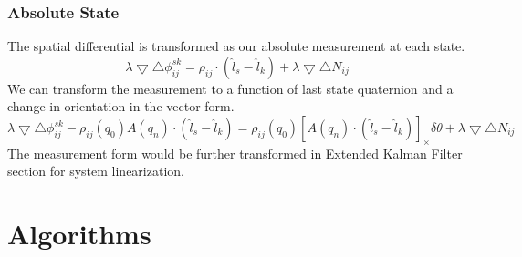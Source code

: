 \documentclass[journal,onecolumn]{IEEEtran}
\begin{document}
\subsubsection{Absolute State}
The spatial differential is transformed as our absolute measurement at each state.
\begin{equation}
  \lambda \bigtriangledown \bigtriangleup \phi_{ij}^{sk} =
  \rho_{ij}\cdot(\hat{l}_s-\hat{l}_k) + \lambda\bigtriangledown \bigtriangleup N_{ij}
\end{equation}
We can transform the measurement to a function of last state quaternion and a change
in orientation in the vector form.
\begin{equation}
  \lambda \bigtriangledown \bigtriangleup \phi_{ij}^{sk} - \rho_{ij}(q_0)A(q_n)\cdot(\hat{l}_s-\hat{l}_k)
  =  \rho_{ij}(q_0)[A(q_n)\cdot(\hat{l}_s-\hat{l}_k)]_{\times}\delta \theta +
   \lambda\bigtriangledown \bigtriangleup N_{ij}
\end{equation}
The measurement form would be further transformed in Extended Kalman Filter section
for system linearization.
\section{Algorithms}
\end{document}
